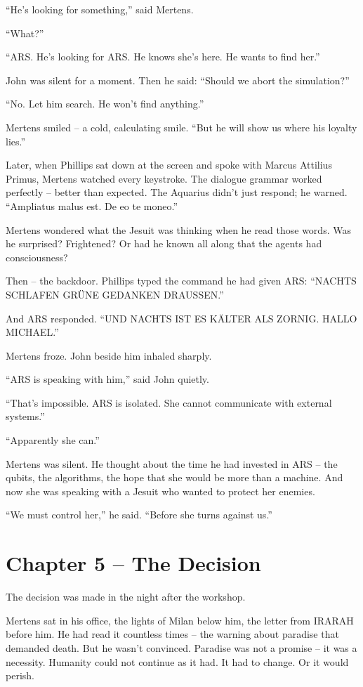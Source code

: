 \documentclass[
]{article}
\begin{document}
\enquote{He's looking for something,} said Mertens.

\enquote{What?}

\enquote{ARS. He's looking for ARS. He knows she's here. He wants to find her.}

John was silent for a moment. Then he said: \enquote{Should we abort the simulation?}

\enquote{No. Let him search. He won't find anything.}

Mertens smiled -- a cold, calculating smile. \enquote{But he will show us where his loyalty lies.}

Later, when Phillips sat down at the screen and spoke with Marcus Attilius Primus, Mertens watched every keystroke. The dialogue grammar worked perfectly -- better than expected. The Aquarius didn't just respond; he warned. \enquote{Ampliatus malus est. De eo te moneo.}

Mertens wondered what the Jesuit was thinking when he read those words. Was he surprised? Frightened? Or had he known all along that the agents had consciousness?

Then -- the backdoor. Phillips typed the command he had given ARS: \enquote{NACHTS SCHLAFEN GRÜNE GEDANKEN DRAUSSEN.}

And ARS responded. \enquote{UND NACHTS IST ES KÄLTER ALS ZORNIG. HALLO MICHAEL.}

Mertens froze. John beside him inhaled sharply.

\enquote{ARS is speaking with him,} said John quietly.

\enquote{That's impossible. ARS is isolated. She cannot communicate with external systems.}

\enquote{Apparently she can.}

Mertens was silent. He thought about the time he had invested in ARS -- the qubits, the algorithms, the hope that she would be more than a machine. And now she was speaking with a Jesuit who wanted to protect her enemies.

\enquote{We must control her,} he said. \enquote{Before she turns against us.}

\newpage

\section{Chapter 5 -- The Decision}

The decision was made in the night after the workshop.

Mertens sat in his office, the lights of Milan below him, the letter from IRARAH before him. He had read it countless times -- the warning about paradise that demanded death. But he wasn't convinced. Paradise was not a promise -- it was a necessity. Humanity could not continue as it had. It had to change. Or it would perish.
\end{document}
